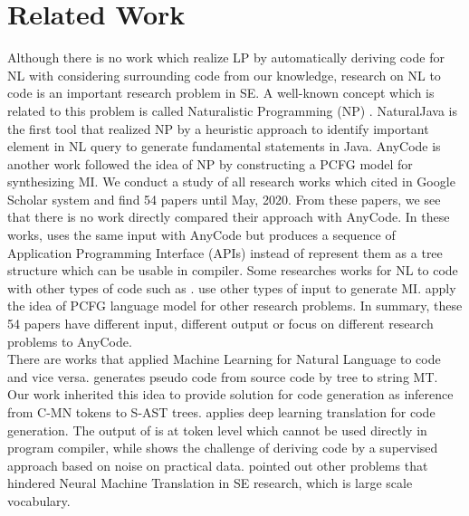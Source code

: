\documentclass[sigconf,review,anonymous]{article}
\begin{document}
\section{Related Work}
Although there is no work which realize LP by automatically deriving code for NL with considering surrounding code from our knowledge, research on NL to code is an important research problem in SE. A well-known concept which is related to this problem is called Naturalistic Programming (NP) \cite{024}. NaturalJava \cite{026} is the first tool that realized NP by a heuristic approach to identify important element in NL query to generate fundamental statements in Java. AnyCode \cite{007} is another work followed the idea of NP by constructing a PCFG model for synthesizing MI. We conduct a study of all research works which cited \cite{007} in Google Scholar system and find 54 papers until May, 2020. From these papers, we see that there is no work directly compared their approach with AnyCode. In these works, \cite{028} uses the same input with AnyCode but produces a sequence of Application Programming Interface (APIs) instead of represent them as a tree structure which can be usable in compiler. Some researches works for NL to code with other types of code such as \cite{027,029,030,031,036}. \cite{032,033} use other types of input to generate MI. \cite{034,035} apply the idea of PCFG language model for other research problems. In summary, these 54 papers have different input, different output or focus on different research problems to AnyCode.
\\
There are works that applied Machine Learning for Natural Language to code and vice versa. \cite{009} generates pseudo code from source code by tree to string MT. Our work inherited this idea to provide solution for code generation as inference from C-MN tokens to S-AST trees. \cite{037,010} applies deep learning translation for code generation. The output of \cite{037} is at token level which cannot be used directly in program compiler, while \cite{010} shows the challenge of deriving code by a supervised approach based on noise on practical data. \cite{013} pointed out other problems that hindered Neural Machine Translation in SE research, which is large scale vocabulary.
\end{document}
